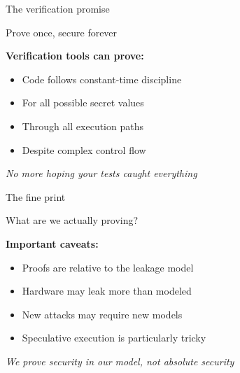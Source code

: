 \documentclass[aspectratio=169, lualatex, handout]{beamer}
\begin{document}
\begin{frame}{The verification promise}
	\begin{center}
		\Large
		Prove once, secure forever
	\end{center}
	\vspace{1em}
	\textbf{Verification tools can prove:}
	\begin{itemize}
		\item Code follows constant-time discipline
		\item For all possible secret values
		\item Through all execution paths
		\item Despite complex control flow
	\end{itemize}
	\vspace{0.5em}
	\begin{center}
		\textit{No more hoping your tests caught everything}
	\end{center}
\end{frame}

\begin{frame}{The fine print}
	\begin{center}
		\Large
		What are we actually proving?
	\end{center}
	\vspace{1em}
	\textbf{Important caveats:}
	\begin{itemize}
		\item Proofs are relative to the leakage model
		\item Hardware may leak more than modeled
		\item New attacks may require new models
		\item Speculative execution is particularly tricky
	\end{itemize}
	\vspace{0.5em}
	\begin{center}
		\textit{We prove security in our model, not absolute security}
	\end{center}
\end{frame}
\end{document}
